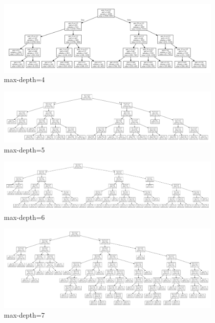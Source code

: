 \documentclass[8pt,a4paper]{article}
\begin{document}
\begin{figure}[H]
    \begin{center}
        \includegraphics[width=550pt]{decision_tree_depth_m1_4.png}
        \caption{max-depth=4}
        
    \end{center}
\end{figure}

\begin{figure}[H]
    \begin{center}
        \includegraphics[width=550pt]{decision_tree_depth_m1_5.png}
        \caption{max-depth=5}
        
    \end{center}
\end{figure}

\begin{figure}[H]
    \begin{center}
        \includegraphics[width=550pt]{decision_tree_depth_m1_6.png}
        \caption{max-depth=6}
        
    \end{center}
\end{figure}

\begin{figure}[H]
    \begin{center}
        \includegraphics[width=550pt]{decision_tree_depth_m1_7.png}
        \caption{max-depth=7}
        
    \end{center}
\end{figure}
\end{document}
